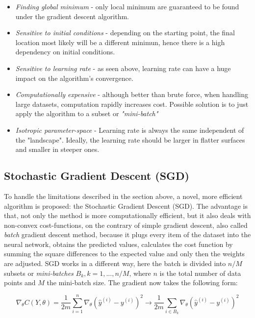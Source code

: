 \begin{itemize}
	\item \textit{Finding global minimum} - only local minimum are guaranteed to be found under the gradient descent algorithm.
	\item \textit{Sensitive to initial conditions} - depending on the starting point, the final location most likely will be a different minimun, hence there is a high dependency on initial conditions.
	\item \textit{Sensitive to learning rate} - as seen above, learning rate can have a huge impact on the algorithm's convergence.
	\item \textit{Computationally expensive} - although better than brute force, when handling large datasets, computation rapidly increases cost. Possible solution is to just apply the algorithm to a subset or \textit{"mini-batch"}
	\item \textit{Isotropic parameter-space} - Learning rate is always the same independent of the "landscape". Ideally, the learning rate should be larger in flatter surfaces and smaller in steeper ones. \cite{ml_phys} 
\end{itemize}


\subsection{Stochastic Gradient Descent (SGD)}

To handle the limitations described in the section above, a novel, more efficient algorithm is proposed: the Stochastic Gradient Descent (SGD). The advantage is that, not only the method is more computationally efficient, but it also deals with non-convex cost-functions, on the contrary of simple gradient descent, also called \textit{batch} gradient descent method, because it plugs every item of the dataset into the neural network, obtains the predicted values, calculates the cost function by summing the square differences to the expected value and only then the weights are adjusted. \cite{nielsenneural}
SGD works in a different way, here the batch is divided into $n/M$ subsets or \textit{mini-batches} $B_k, k={1,...,n/M}$, where $n$ is the total number of data points and $M$ the mini-batch size. The gradient now takes the following form: 

\begin{equation}
	\nabla_{\theta} C(Y,\theta) = \frac{1}{2m}\sum_{i=1}^{n}\nabla_{\theta} (\hat{y}^{(i)} - y^{(i)})^2 \rightarrow \frac{1}{2m}\sum_{i \in B_k}\nabla_{\theta} (\hat{y}^{(i)} - y^{(i)})^2
\end{equation}



